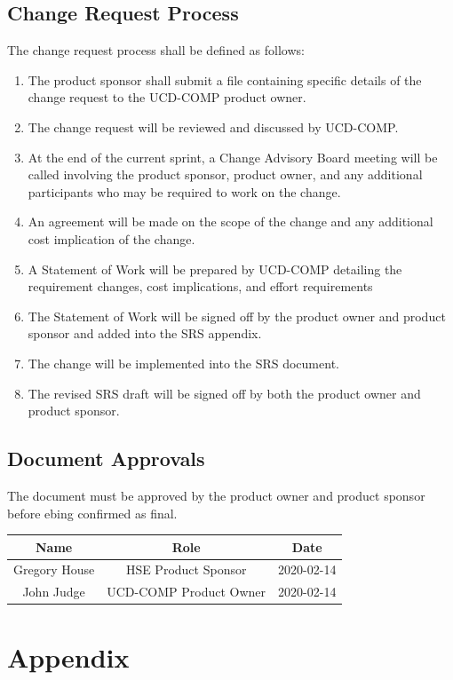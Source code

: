 \documentclass{scrreprt}
\begin{document}
\section{Change Request Process}
The change request process shall be defined as follows:
\begin{enumerate}
	\item The product sponsor shall submit a file containing specific details of the change request to the UCD-COMP product owner. 
	\item The change request will be reviewed and discussed by UCD-COMP.
	\item At the end of the current sprint, a Change Advisory Board meeting will be called involving the product sponsor, product owner, and any additional participants who may be required to work on the change.
	\item An agreement will be made on the scope of the change and any additional cost implication of the change. 
	\item A Statement of Work will be prepared by UCD-COMP detailing the requirement changes, cost implications, and effort requirements
	\item The Statement of Work will be signed off by the product owner and product sponsor and added into the SRS appendix.
	\item The change will be implemented into the SRS document.
	\item The revised SRS draft will be signed off by both the product owner and product sponsor.
\end{enumerate}

\section{Document Approvals}
The document must be approved by the product owner and product sponsor before ebing confirmed as final.


\begin{center}
	\begin{tabular}{|c|c|c|}
		\hline
		Name & Role & Date \\
		\hline
		Gregory House & HSE Product Sponsor & 2020-02-14\\
		\hline
		 John Judge & UCD-COMP Product Owner & 2020-02-14 \\
		\hline
	\end{tabular}
\end{center}

\chapter{Appendix}
\end{document}
